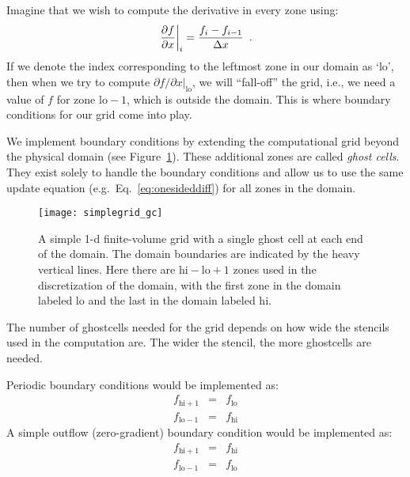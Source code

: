 Imagine that we wish to compute the derivative in every zone using:
\begin{equation}
\left . \frac{\partial f}{\partial x} \right |_i = \frac{f_i - f_{i-1}}{\Delta x} \enskip .
\label{eq:onesideddiff}
\end{equation}
If we denote the index corresponding to the leftmost zone in our
domain as `lo', then when we try to compute ${\partial f}/{\partial x}
|_\mathrm{lo}$, we will ``fall-off'' the grid, i.e., we need a value
of $f$ for zone $\mathrm{lo}-1$, which is outside the domain.  This is
where boundary conditions for our grid come into play.

We implement boundary conditions by extending the computational grid
beyond the physical domain (see Figure~\ref{fig:fv_gc}).  These
additional zones are called {\em ghost cells}.  They exist solely to
handle the boundary conditions and allow us to use the same update
equation (e.g.\ Eq.~\ref{eq:onesideddiff}) for all zones in the
domain.

\begin{figure}[t]
\centering
\texttt{[image: simplegrid\_gc]}
\caption[A simple 1-d finite-volume grid with ghost cells]
        {\label{fig:fv_gc} A simple 1-d finite-volume grid with a
          single ghost cell at each end of the domain.  The domain
          boundaries are indicated by the heavy vertical lines.  Here
          there are $\mathrm{hi}-\mathrm{lo}+1$ zones used in the
          discretization of the domain, with the first zone in the
          domain labeled $\mathrm{lo}$ and the last in the domain
          labeled $\mathrm{hi}$.}
\end{figure}

The number of ghostcells needed for the grid depends on how wide the
stencils used in the computation are.  The wider the stencil, the more
ghostcells are needed.

Periodic boundary conditions would be implemented as:
\begin{eqnarray}
f_{\mathrm{hi}+1} &=& f_\mathrm{lo} \\
f_{\mathrm{lo}-1} &=& f_\mathrm{hi}
\end{eqnarray}
A simple outflow (zero-gradient) boundary condition would be implemented as:
\begin{eqnarray}
f_{\mathrm{hi}+1} &=& f_\mathrm{hi} \\
f_{\mathrm{lo}-1} &=& f_\mathrm{lo}
\end{eqnarray}


